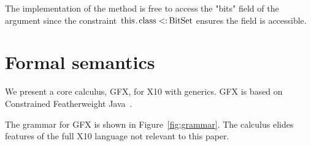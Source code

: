 \documentclass[preprint,nocopyrightspace,9pt]{sigplanconf}
\newcommand\gxx{GFX\xspace}
\begin{document}
\noindent
The implementation of the method is free to access the
\xcd"bits" field of the argument since the constraint
$\Xcd{this}.\Xcd{class} \subtype \Xcd{BitSet}$ ensures the field is
accessible.



\section{Formal semantics}
\label{sec:semantics}

We present a core calculus, \gxx, for X10 with generics.
\gxx is based on Constrained Featherweight
Java~\cite{constrained-types}.


The grammar for \gxx is shown in 
Figure~\ref{fig:grammar}.  The calculus elides features of the
full X10 language not relevant to this paper.
\end{document}
